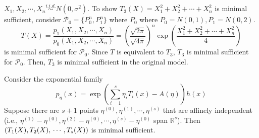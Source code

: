 \documentclass[a4paper]{article}
\begin{document}
\begin{eg}
	$X_1, X_2, \cdots, X_n \stackrel{i.i.d.}{\sim} N(0,\sigma^2)$. To show $T_3(X)=X_1^2+X_2^2+\cdots+X_n^2$ is minimal sufficient, consider $\mathcal{P}_0=\{P_0^n,P_1^n\}$ where $P_0$ where $P_0 = N(0,1), P_1 = N(0,2)$.
	\begin{equation}
		T(X) = \frac{p_1(X_1,X_2,\cdots,X_n)}{p_0(X_1,X_2,\cdots,X_n)}=\left(\frac{\sqrt{2\pi}}{\sqrt{4\pi}}\right)^n \exp\left(\frac{X_1^2+X_2^2+\cdots+X_n^2}{4}\right)
	\end{equation}
	is minimal sufficient for $\mathcal{P}_0$. Since $T$ is equivalent to $T_3$, $T_3$ is minimal sufficient for $\mathcal{P}_0$. Then, $T_3$ is minimal sufficient in the original model.
\end{eg}

\begin{cor}
	Consider the exponential family
	\begin{equation*}
		p_\eta(x) = \exp(\sum\limits_{i=1}^s \eta_i T_i(x) - A(\eta))h(x)
	\end{equation*}
	Suppose there are $s+1$ points $\eta^{(0)},\eta^{(1)},\cdots, \eta^{(s)}$ that are affinely independent (i.e., $\eta^{(1)}-\eta^{(0)},\eta^{(2)}-\eta^{(0)},\cdots,\eta^{(s)}-\eta^{(0)}$ span $\mathbb{R}^s$). Then $(T_1(X),T_2(X),\\ \cdots,T_s(X))$ is minimal sufficient.
\end{cor}
\end{document}
